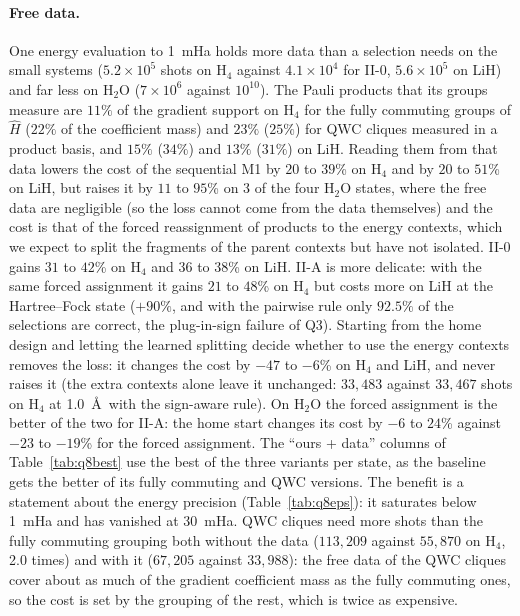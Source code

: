 \documentclass[aps,pra,reprint,superscriptaddress,nofootinbib]{revtex4-2}
\begin{document}
\paragraph{Free data.} One energy evaluation to 1~mHa holds more data than a selection needs on the small systems ($5.2\times10^{5}$ shots on H$_4$ against $4.1\times10^{4}$ for II-0, $5.6\times10^{5}$ on LiH) and far less on H$_2$O ($7\times10^{6}$ against $10^{10}$). The Pauli products that its groups measure are $11\%$ of the gradient support on H$_4$ for the fully commuting groups of $\hat H$ ($22\%$ of the coefficient mass) and $23\%$ ($25\%$) for QWC cliques measured in a product basis, and $15\%$ ($34\%$) and $13\%$ ($31\%$) on LiH. Reading them from that data lowers the cost of the sequential M1 by $20$ to $39$\% on H$_4$ and by $20$ to $51$\% on LiH, but raises it by $11$ to $95$\% on 3 of the four H$_2$O states, where the free data are negligible (so the loss cannot come from the data themselves) and the cost is that of the forced reassignment of products to the energy contexts, which we expect to split the fragments of the parent contexts but have not isolated. II-0 gains $31$ to $42$\% on H$_4$ and $36$ to $38$\% on LiH. II-A is more delicate: with the same forced assignment it gains $21$ to $48$\% on H$_4$ but costs more on LiH at the Hartree--Fock state ($+90\%$, and with the pairwise rule only $92.5\%$ of the selections are correct, the plug-in-sign failure of Q3). Starting from the home design and letting the learned splitting decide whether to use the energy contexts removes the loss: it changes the cost by $-47$ to $-6$\% on H$_4$ and LiH, and never raises it (the extra contexts alone leave it unchanged: $33{,}483$ against $33{,}467$ shots on H$_4$ at 1.0~\AA\ with the sign-aware rule). On H$_2$O the forced assignment is the better of the two for II-A: the home start changes its cost by $-6$ to $24$\% against $-23$ to $-19$\% for the forced assignment. The ``ours + data'' columns of Table~\ref{tab:q8best} use the best of the three variants per state, as the baseline gets the better of its fully commuting and QWC versions. The benefit is a statement about the energy precision (Table~\ref{tab:q8eps}): it saturates below 1~mHa and has vanished at 30~mHa. QWC cliques need more shots than the fully commuting grouping both without the data ($113{,}209$ against $55{,}870$ on H$_4$, 2.0 times) and with it ($67{,}205$ against $33{,}988$): the free data of the QWC cliques cover about as much of the gradient coefficient mass as the fully commuting ones, so the cost is set by the grouping of the rest, which is twice as expensive.
\end{document}
